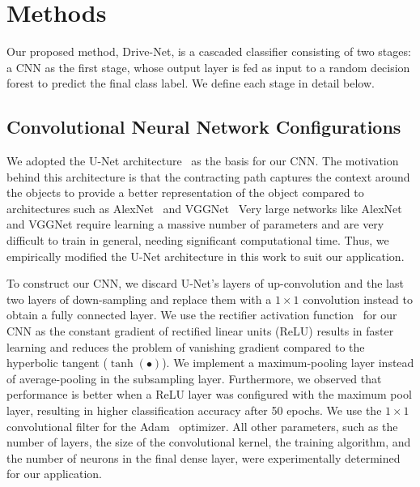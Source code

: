 \section{Methods}
Our proposed method, Drive-Net, is a cascaded classifier consisting of two stages: a CNN as the first stage, whose output layer is fed as input to a random decision forest to predict the final class label. We define each stage in detail below.


\subsection{Convolutional Neural Network Configurations}
We adopted the U-Net architecture~\cite{ronneberger_UNet_2015} as the basis for our CNN\@. The motivation behind this architecture is that the contracting path captures the context around the objects to provide a better representation of the object compared to architectures such as AlexNet~\cite{krizhevsky_One_2014} and VGGNet~\cite{simonyan_Very_2014} Very large networks like AlexNet and VGGNet require learning a massive number of parameters and are very difficult to train in general, needing significant computational time. Thus, we empirically modified the U-Net architecture in this work to suit our application.

To construct our CNN, we discard U-Net's layers of up-convolution and the last two layers of down-sampling and replace them with a $1\times1 $ convolution instead to obtain a fully connected layer. We use the rectifier activation function~\cite{simonyan_Very_2014} for our CNN as the constant gradient of rectified linear units (ReLU) results in faster learning and reduces the problem of vanishing gradient compared to the hyperbolic tangent (${\tanh{(\bullet)}} $). We implement a maximum-pooling layer instead of average-pooling in the subsampling layer. Furthermore, we observed that performance is better when a ReLU layer was configured with the maximum pool layer, resulting in higher classification accuracy after 50 epochs. We use the $1\times1 $ convolutional filter for the Adam~\cite{kingma_Adam_2014} optimizer. All other parameters, such as the number of layers, the size of the convolutional kernel, the training algorithm, and the number of neurons in the final dense layer, were experimentally determined for our application.

